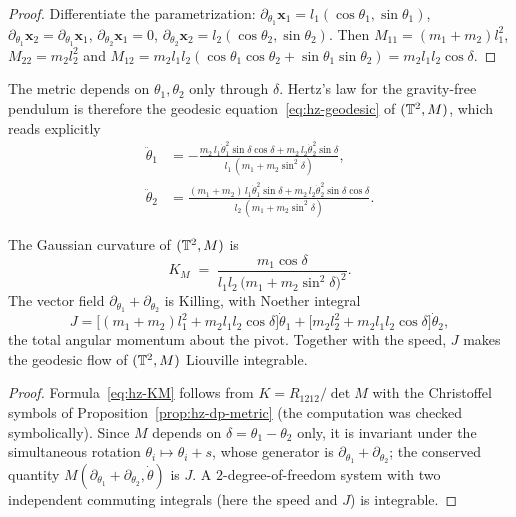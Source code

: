 \begin{proof}
Differentiate the parametrization: $\partial_{\theta_1}\mathbf x_1=l_1(\cos\theta_1,\sin\theta_1)$,
$\partial_{\theta_1}\mathbf x_2=\partial_{\theta_1}\mathbf x_1$,
$\partial_{\theta_2}\mathbf x_1=0$, $\partial_{\theta_2}\mathbf x_2=l_2(\cos\theta_2,\sin\theta_2)$.
Then $M_{11}=(m_1+m_2)l_1^2$, $M_{22}=m_2l_2^2$ and
$M_{12}=m_2l_1l_2(\cos\theta_1\cos\theta_2+\sin\theta_1\sin\theta_2)=m_2l_1l_2\cos\delta$.
\end{proof}

The metric depends on $\theta_1,\theta_2$ only through $\delta$. Hertz's
law for the gravity-free pendulum is therefore the geodesic
equation~\eqref{eq:hz-geodesic} of $(\mathbb{T}^2,M)$, which reads explicitly
\begin{equation}\label{eq:hz-dp-free}
\begin{aligned}
  \ddot\theta_1&=-\frac{m_2\,l_1\dot\theta_1^2\sin\delta\cos\delta+m_2\,l_2\dot\theta_2^2\sin\delta}{l_1\,(m_1+m_2\sin^2\delta)},\\[2pt]
  \ddot\theta_2&=\frac{(m_1+m_2)\,l_1\dot\theta_1^2\sin\delta+m_2\,l_2\dot\theta_2^2\sin\delta\cos\delta}{l_2\,(m_1+m_2\sin^2\delta)} .
\end{aligned}
\end{equation}

\begin{proposition}\label{prop:hz-dp-curvature}
The Gaussian curvature of $(\mathbb{T}^2,M)$ is
\begin{equation}\label{eq:hz-KM}
  K_M\;=\;\frac{m_1\cos\delta}{l_1l_2\,\bigl(m_1+m_2\sin^2\delta\bigr)^{2}} .
\end{equation}
The vector field $\partial_{\theta_1}+\partial_{\theta_2}$ is Killing, with Noether
integral
\[
  J=\bigl[(m_1+m_2)l_1^2+m_2l_1l_2\cos\delta\bigr]\dot\theta_1
   +\bigl[m_2l_2^2+m_2l_1l_2\cos\delta\bigr]\dot\theta_2 ,
\]
the total angular momentum about the pivot. Together with the
speed, $J$ makes the geodesic flow of $(\mathbb{T}^2,M)$ Liouville integrable.
\end{proposition}

\begin{proof}
Formula~\eqref{eq:hz-KM} follows from $K=R_{1212}/\det M$ with the Christoffel
symbols of Proposition~\ref{prop:hz-dp-metric} (the computation was checked
symbolically). Since $M$ depends on $\delta=\theta_1-\theta_2$ only, it is
invariant under the simultaneous rotation $\theta_i\mapsto\theta_i+s$, whose
generator is $\partial_{\theta_1}+\partial_{\theta_2}$; the conserved quantity
$M(\partial_{\theta_1}+\partial_{\theta_2},\dot\theta)$ is $J$. A $2$-degree-of-freedom
system with two independent commuting integrals (here the speed and $J$) is
integrable.
\end{proof}

